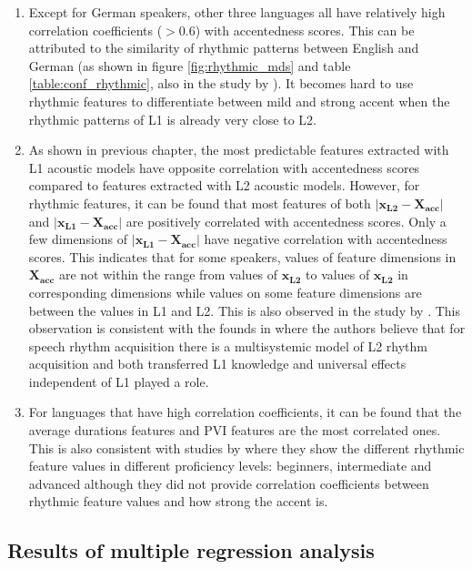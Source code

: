 \begin{enumerate}
\item Except for German speakers, other three languages all have relatively high correlation coefficients ($>$0.6) with accentedness scores. This can be attributed to the similarity of rhythmic patterns between English and German (as shown in figure \ref{fig:rhythmic_mds} and table \ref{table:conf_rhythmic}, also in the study by \cite{li2014l2}). It becomes hard to use rhythmic features to differentiate between mild and strong accent when the rhythmic patterns of L1 is already very close to L2.
\item As shown in previous chapter, the most predictable features extracted with L1 acoustic models have opposite correlation with accentedness scores compared to features extracted with L2 acoustic models. However, for rhythmic features, it can be found that most features of both $\left| \mathbf{x_{L2}}-\mathbf{X_{acc}} \right|$ and $\left| \mathbf{x_{L1}}- \mathbf{X_{acc}} \right|$ are positively correlated with accentedness scores. Only a few dimensions of $\left| \mathbf{x_{L1}}- \mathbf{X_{acc}} \right|$ have negative correlation with accentedness scores. This indicates that for some speakers, values of feature dimensions in $\mathbf{X_{acc}}$ are not within the range from values of $\mathbf{x_{L2}}$ to values of $\mathbf{x_{L2}}$ in corresponding dimensions while values on some feature dimensions are between the values in L1 and L2. This is also observed in the study by \cite{white2007calibrating}. This observation is consistent with the founds in \citep{li2014l2} where the authors believe that for speech rhythm acquisition there is a multisystemic model of L2 rhythm acquisition and both transferred L1 knowledge and universal effects independent of L1 played a role.
\item For languages that have high correlation coefficients, it can be found that the average durations features and PVI features are the most correlated ones. This is also consistent with studies by \cite{ordin2015acquisition} where they show the different rhythmic feature values in different proficiency levels: beginners, intermediate and advanced although they did not provide correlation coefficients between rhythmic feature values and how strong the accent is.
\end{enumerate}

\subsection{Results of multiple regression analysis}

